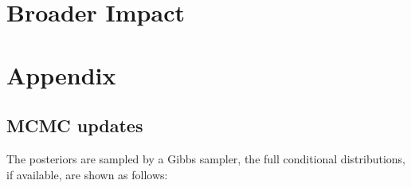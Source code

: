 \documentclass{article}
\begin{document}
	\section*{Broader Impact}
	
	\newpage
	{
		\small
		
	}
	
	
	\appendix
	
	\section{Appendix}
	
	\subsection{MCMC updates}
	The posteriors are sampled by a Gibbs sampler, the full conditional distributions, if available, are shown as follows:
	
\end{document}
